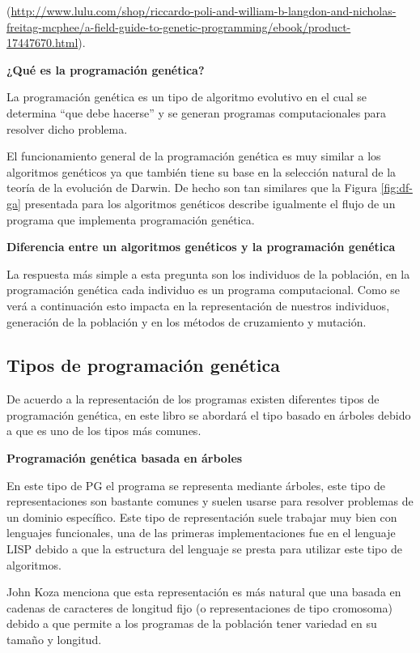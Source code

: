 \documentclass[11pt,fleqn]{book} %
\begin{document}
(\url{http://www.lulu.com/shop/riccardo-poli-and-william-b-langdon-and-nicholas-freitag-mcphee/a-field-guide-to-genetic-programming/ebook/product-17447670.html}).

\clearpage

\textbf{¿Qué es la programación genética?}

La programación genética es un tipo de algoritmo evolutivo en el cual se determina “que debe hacerse” y se generan programas computacionales para resolver dicho problema.

El funcionamiento general de la programación genética es muy similar a los algoritmos genéticos ya que también tiene su base en la selección natural de la teoría de la evolución de Darwin. De hecho son tan similares que la Figura \ref{fig:df-ga} presentada para los algoritmos genéticos describe igualmente el flujo de un programa que implementa programación genética.

\textbf{Diferencia entre un algoritmos genéticos y la programación genética}

La respuesta más simple a esta pregunta son los individuos de la población, en la programación genética cada individuo es un programa computacional.
Como se verá a continuación esto impacta en la representación de nuestros individuos, generación de la población y en los métodos de cruzamiento y mutación.

\subsection{Tipos de programación genética}

De acuerdo a la representación de los programas existen diferentes tipos de programación genética, en este libro se abordará el tipo basado en árboles debido a que es uno de los tipos más comunes.

\textbf{Programación genética basada en árboles}

En este tipo de PG el programa se representa mediante árboles, este tipo de representaciones son bastante comunes y suelen usarse para resolver problemas de un dominio específico. Este tipo de representación suele trabajar muy bien con lenguajes funcionales, una de las primeras implementaciones fue en el lenguaje LISP debido a que la estructura del lenguaje se presta para utilizar este tipo de algoritmos.

John Koza \cite{koza1992genetic} menciona que esta representación es más natural que una basada en cadenas de caracteres de longitud fijo (o representaciones de tipo cromosoma) debido a que permite a los programas de la población tener variedad en su tamaño y longitud.
\end{document}
